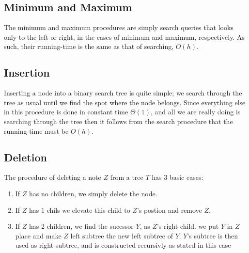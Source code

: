 \subsection{Minimum and Maximum}
The minimum and maximum procedures are simply search queries that looks only
to the left or right, in the cases of minimum and maximum, respectively. As
such, their running-time is the same as that of searching, $O(h)$.



\subsection{Insertion}
Inserting a node into a binary search tree is quite simple; we search through
the tree as usual until we find the spot where the node belongs. Since
everything else in this procedure is done in constant time $\Theta(1)$, and
all we are really doing is searching through the tree then it follows from the
search procedure that the running-time must be $O(h)$.

\subsection{Deletion}
The procedure of deleting a note $Z$ from a tree $T$ has 3 basic cases:

\begin{enumerate}
\item{If $Z$ has no children, we simply delete the node.}
\item{If $Z$ has 1 chils we elevate this child to $Z$'s postion and remove $Z$.}
\item{If $Z$ has 2 children, we find the sucessor $Y$, as $Z$'s right child. we put $Y$ in $Z$ place and make $Z$ left subtree the new left subtree of $Y$.
$Y$'s subtree is then used as right subtree, and is constructed recursivly as stated in this case}
\end{enumerate}

